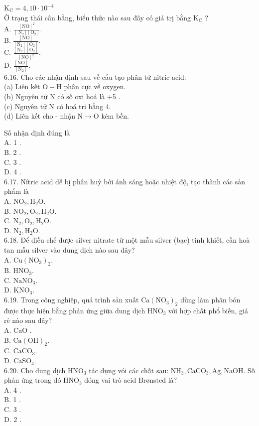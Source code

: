 \documentclass[10pt]{article}
\begin{document}
$\mathrm{K}_{\mathrm{C}}=4,10 \cdot 10^{-4}$\\
Ờ trạng thái cân bằng, biểu thức nào sau đây có giá trị bằng $\mathrm{K}_{\mathrm{C}}$ ?\\
A. $\frac{[\mathrm{NO}]^{2}}{\left[\mathrm{~N}_{2}\right]\left[\mathrm{O}_{2}\right]}$.\\
B. $\frac{[\mathrm{NO}]}{\left[\mathrm{N}_{2}\right]\left[\mathrm{O}_{2}\right]}$.\\
C. $\frac{\left[\mathrm{N}_{2}\right]\left[\mathrm{O}_{2}\right]}{[\mathrm{NO}]^{2}}$.\\
D. $\frac{[\mathrm{NO}]}{\left[\mathrm{N}_{2}\right]}$.\\
6.16. Cho các nhận định sau về cấu tạo phân tử nitric acid:\\
(a) Liên kết $\mathrm{O}-\mathrm{H}$ phân cực về oxygen.\\
(b) Nguyên tữ N có số oxi hoá là +5 .\\
(c) Nguyên tử N có hoá tri bằng 4.\\
(d) Liên kết cho - nhận $\mathrm{N} \rightarrow \mathrm{O}$ kém bền.

Số nhận định đúng là\\
A. 1 .\\
B. 2 .\\
C. 3 .\\
D. 4 .\\
6.17. Nítric acid dễ bị phân huỷ bởi ánh sáng hoặc nhiệt độ, tạo thành các sản phẩm là\\
A. $\mathrm{NO}_{2}, \mathrm{H}_{2} \mathrm{O}$.\\
B. $\mathrm{NO}_{2}, \mathrm{O}_{2}, \mathrm{H}_{2} \mathrm{O}$.\\
C. $\mathrm{N}_{2}, \mathrm{O}_{2}, \mathrm{H}_{2} \mathrm{O}$.\\
D. $\mathrm{N}_{2}, \mathrm{H}_{2} \mathrm{O}$.\\
6.18. Để điều chế được silver nitrate từ một mẫu silver (bạc) tinh khiết, cần hoà tan mẫu silver vào dung dịch nào sau đây?\\
A. $\mathrm{Cu}\left(\mathrm{NO}_{3}\right)_{2}$.\\
B. $\mathrm{HNO}_{3}$.\\
C. $\mathrm{NaNO}_{3}$.\\
D. $\mathrm{KNO}_{3}$.\\
6.19. Trong công nghiệp, quá trình sản xuất $\mathrm{Ca}\left(\mathrm{NO}_{3}\right)_{2}$ dùng làm phân bón được thực hiện bằng phản ứng giữa dung dịch $\mathrm{HNO}_{3}$ với hợp chất phổ biến, giá rẻ nào sau đây?\\
A. CaO .\\
B. $\mathrm{Ca}(\mathrm{OH})_{2}$.\\
C. $\mathrm{CaCO}_{3}$.\\
D. $\mathrm{CaSO}_{4}$.\\
6.20. Cho dung dịch $\mathrm{HNO}_{3}$ tác dụng vói các chất sau: $\mathrm{NH}_{3}, \mathrm{CaCO}_{3}, \mathrm{Ag}, \mathrm{NaOH}$. Số phản ứng trong đó $\mathrm{HNO}_{3}$ đóng vai trò acid Brønsted là?\\
A. 4 .\\
B. 1 .\\
C. 3 .\\
D. 2 .
\end{document}
